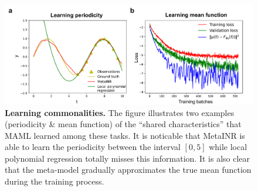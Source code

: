 \documentclass{article}
\begin{document}
\begin{figure}[htb]
  \centering
  \includegraphics[width=\textwidth]{learning_commonalities.pdf}
  \caption{\textbf{Learning commonalities.} The figure illustrates two examples (periodicity \& mean function) of the ``shared characteristics'' that MAML learned among these tasks. 
  It is noticable that MetaINR is able to learn the periodicity between the interval $[0,5]$ while local polynomial regression totally misses this information. It is also clear that the meta-model gradually approximates the true mean function during the training process. }
  \label{Learning commonalities}
\end{figure}



\end{document}
